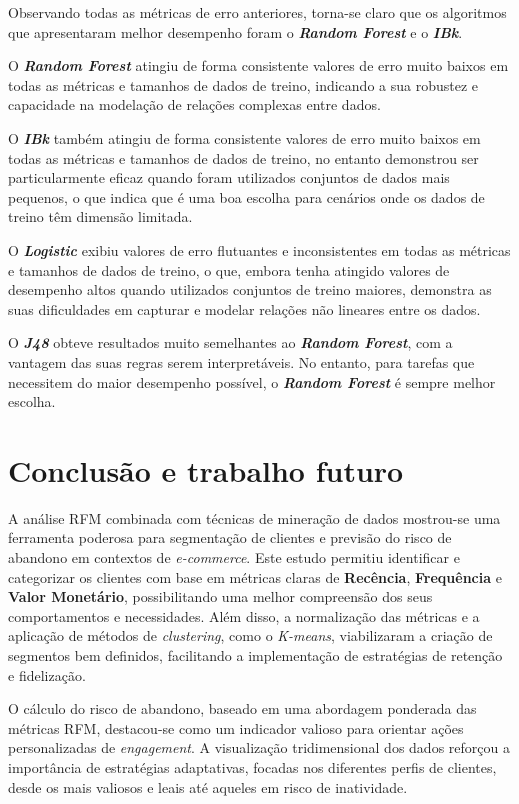 \documentclass{easychair}
\begin{document}
Observando todas as métricas de erro anteriores, torna-se claro que os algoritmos que apresentaram melhor desempenho foram o \textbf{\textit{Random Forest}} e o \textbf{\textit{IBk}}.

O \textbf{\textit{Random Forest}} atingiu de forma consistente valores de erro muito baixos em todas as métricas e tamanhos de dados de treino, indicando a sua robustez e capacidade na modelação de relações complexas entre dados.

O \textbf{\textit{IBk}} também atingiu de forma consistente valores de erro muito baixos em todas as métricas e tamanhos de dados de treino, no entanto demonstrou ser particularmente eficaz quando foram utilizados conjuntos de dados mais pequenos, o que indica que é uma boa escolha para cenários onde os dados de treino têm dimensão limitada.

O \textbf{\textit{Logistic}} exibiu valores de erro flutuantes e inconsistentes em todas as métricas e tamanhos de dados de treino, o que, embora tenha atingido valores de desempenho altos quando utilizados conjuntos de treino maiores, demonstra as suas dificuldades em capturar e modelar relações não lineares entre os dados.

O \textbf{\textit{J48}} obteve resultados muito semelhantes ao \textbf{\textit{Random Forest}}, com a vantagem das suas regras serem interpretáveis. No entanto, para tarefas que necessitem do maior desempenho possível, o \textbf{\textit{Random Forest}} é sempre melhor escolha.

\section{Conclusão e trabalho futuro}
A análise RFM combinada com técnicas de mineração de dados mostrou-se uma ferramenta poderosa para segmentação de clientes e previsão do risco de abandono em contextos de \textit{e-commerce}. Este estudo permitiu identificar e categorizar os clientes com base em métricas claras de \textbf{Recência}, \textbf{Frequência} e \textbf{Valor Monetário}, possibilitando uma melhor compreensão dos seus comportamentos e necessidades. Além disso, a normalização das métricas e a aplicação de métodos de \textit{clustering}, como o \textit{K-means}, viabilizaram a criação de segmentos bem definidos, facilitando a implementação de estratégias de retenção e fidelização.

O cálculo do risco de abandono, baseado em uma abordagem ponderada das métricas RFM, destacou-se como um indicador valioso para orientar ações personalizadas de \textit{engagement}. A visualização tridimensional dos dados reforçou a importância de estratégias adaptativas, focadas nos diferentes perfis de clientes, desde os mais valiosos e leais até aqueles em risco de inatividade.
\end{document}
